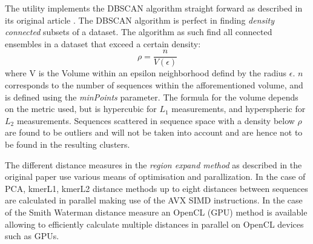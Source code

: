 The utility implements the DBSCAN algorithm straight forward as
described in its original article \cite{dbscan}. The DBSCAN algorithm
is perfect in finding \emph{density connected} subsets of a
dataset. The algorithm as such find all connected ensembles in a
dataset that exceed a certain density:
\begin{equation}
  \rho = \frac{n}{V(\epsilon)} \label{eqn-density}
\end{equation}
where V is the Volume within an epsilon neighborhood defind by the
radius $\epsilon$. $n$ corresponds to the number of sequences within
the afforementioned volume, and is defined using the \emph{minPoints}
parameter. The formula for the volume depends on the metric used, but
is hypercubic for $L_1$ measurements, and hyperspheric for $L_2$
measurements. Sequences scattered in sequence space with a density
below $\rho$ are found to be outliers and will not be taken into
account and are hence not to be found in the resulting clusters. 

The different distance measures in the \emph{region expand method} as
described in the original paper use various means of optimisation and
parallization. In the case of PCA, kmerL1, kmerL2 distance methods up to eight
distances between sequences are calculated in parallel making use of
the AVX SIMD instructions. In the case of the Smith Waterman distance
measure an OpenCL (GPU) method is available allowing to efficiently calculate
multiple distances in parallel on OpenCL devices such as GPUs. 

